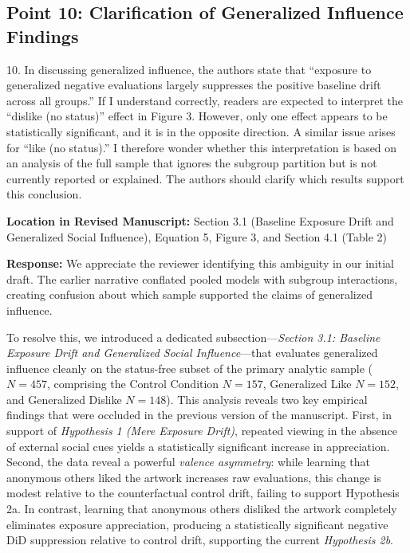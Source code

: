 \documentclass[11pt, letterpaper]{article}
\begin{document}
\vspace{10pt}

\subsection*{Point 10: Clarification of Generalized Influence Findings}

\begin{reviewercomment}
10. In discussing generalized influence, the authors state that ``exposure to generalized negative evaluations largely suppresses the positive baseline drift across all groups.'' If I understand correctly, readers are expected to interpret the ``dislike (no status)'' effect in Figure 3. However, only one effect appears to be statistically significant, and it is in the opposite direction. A similar issue arises for ``like (no status).'' I therefore wonder whether this interpretation is based on an analysis of the full sample that ignores the subgroup partition but is not currently reported or explained. The authors should clarify which results support this conclusion.
\end{reviewercomment}

\textbf{Location in Revised Manuscript:} Section 3.1 (Baseline Exposure Drift and Generalized Social Influence), Equation 5, Figure 3, and Section 4.1 (Table 2)

\textbf{Response:}
We appreciate the reviewer identifying this ambiguity in our initial draft. The earlier narrative conflated pooled models with subgroup interactions, creating confusion about which sample supported the claims of generalized influence.

To resolve this, we introduced a dedicated subsection---\textit{Section 3.1: Baseline Exposure Drift and Generalized Social Influence}---that evaluates generalized influence cleanly on the status-free subset of the primary analytic sample ($N = 457$, comprising the Control Condition $N = 157$, Generalized Like $N = 152$, and Generalized Dislike $N = 148$). This analysis reveals two key empirical findings that were occluded in the previous version of the manuscript. First, in support of \textit{Hypothesis 1 (Mere Exposure Drift)}, repeated viewing in the absence of external social cues yields a statistically significant increase in appreciation. Second, the data reveal a powerful \textit{valence asymmetry}: while learning that anonymous others liked the artwork increases raw evaluations, this change is modest relative to the counterfactual control drift, failing to support Hypothesis 2a. In contrast, learning that anonymous others disliked the artwork completely eliminates exposure appreciation, producing a statistically significant negative DiD suppression relative to control drift, supporting the current \textit{Hypothesis 2b}.
\end{document}
